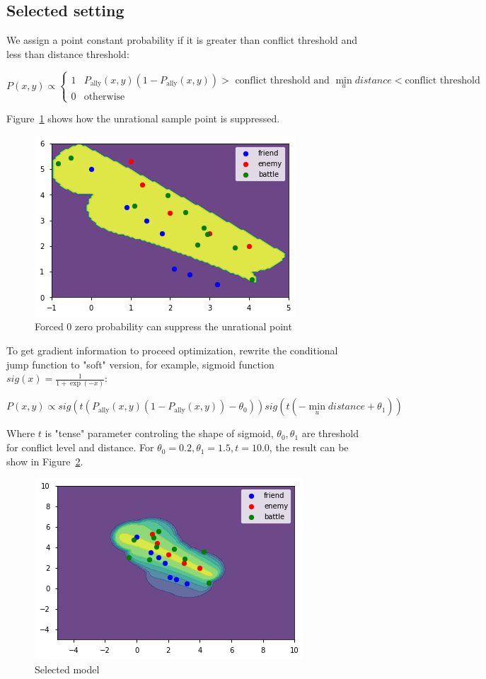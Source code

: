 \documentclass{article}
\begin{document}
\subsection{Selected setting}

We assign a point constant probability if it is greater than conflict threshold and less than distance 
threshold:

$$
P(x,y) \propto
\begin{cases}
1 & P_\text{ally}(x,y) (1-P_\text{ally}(x,y)) > \text{ conflict threshold and }
    \min_{u} distance < \text{conflict threshold} \\
0 & \text{otherwise}
\end{cases}
$$

Figure~\ref{fig:combFive} shows how the unrational sample point is suppressed.

\begin{figure}[h!]
\includegraphics[width=0.6\linewidth]{comb5.png}
\caption{Forced 0 zero probability can suppress the unrational point}
\label{fig:combFive}
\end{figure}

To get gradient information to proceed optimization, rewrite the conditional jump function to "soft"
version, for example, sigmoid function $sig(x) = \frac{1}{1+\exp(-x)}$:

$$
P(x,y) \propto sig(t (P_\text{ally}(x,y) (1-P_\text{ally}(x,y)) - \theta_0)) sig(t(-\min_{u} distance + \theta_1))
$$

Where $t$ is "tense" parameter controling the shape of sigmoid, $\theta_0,\theta_1$ are threshold for
conflict level and distance. For $\theta_0=0.2,\theta_1=1.5,t = 10.0$, the result can be show in Figure~\ref{fig:combSix}.

\begin{figure}[h!]
\includegraphics[width=0.6\linewidth]{comb6.png}
\caption{Selected model}
\label{fig:combSix}
\end{figure}
\end{document}
